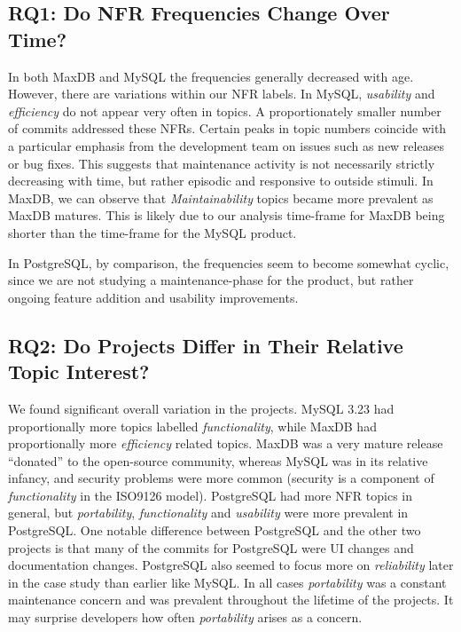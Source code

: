 \documentclass[smallextended]{svjour3}       %
\begin{document}
\subsection{RQ1: Do NFR Frequencies Change Over Time?}
In both MaxDB and MySQL the frequencies generally decreased with age. 
However, there are variations within our NFR labels. In MySQL, \emph{usability} and \emph{efficiency} do not appear very often in topics. 
A proportionately smaller number of commits addressed these NFRs.
Certain peaks in topic numbers coincide with a particular emphasis from the development team on issues such as new releases or bug fixes.
This suggests that maintenance activity is not necessarily strictly decreasing with time, but rather episodic and responsive to outside stimuli. 
In MaxDB, we can observe that \emph{Maintainability} topics became more prevalent as MaxDB matures. 
This is likely due to our analysis time-frame for MaxDB being shorter than the time-frame for the MySQL product. 

In PostgreSQL, by comparison, the frequencies seem to become somewhat cyclic, since we are not studying a maintenance-phase for the product, but rather ongoing
feature addition and usability improvements.

\subsection{RQ2: Do Projects Differ in Their Relative  Topic Interest?}
We found significant overall variation in the projects. MySQL 3.23 had proportionally more
topics labelled \emph{functionality}, while MaxDB had proportionally more
\emph{efficiency} related topics. MaxDB was a very mature release ``donated'' to the open-source community, 
whereas MySQL was in its relative infancy, and	
security problems were more common (security is a component of \emph{functionality} in the ISO9126 model). 
PostgreSQL had more NFR topics in general, but \emph{portability},
\emph{functionality} and \emph{usability} were more prevalent in
PostgreSQL. One notable difference between PostgreSQL and the other
two projects is that many of the commits for PostgreSQL were UI
changes and documentation changes. PostgreSQL also seemed to focus
more on \emph{reliability} later in the case study than earlier like MySQL.
In all cases \emph{portability} was a constant maintenance concern and was prevalent throughout the lifetime of the projects. It may surprise developers
how often \emph{portability} arises as a concern.
\end{document}

